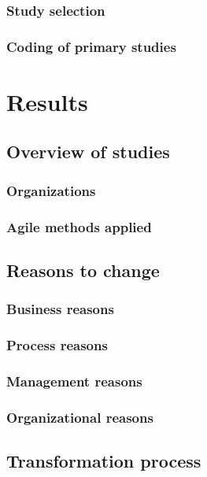 \documentclass{article}
\begin{document}
\subsubsection{Study selection}

\subsubsection{Coding of primary studies}

\section{Results}

\subsection{Overview of studies}

\setlength{\parskip}{7pt}
\subsubsection{Organizations}

\subsubsection{Agile methods applied}

\setlength{\parskip}{7pt}
\subsection{Reasons to change}

\subsubsection{Business reasons}

\subsubsection{Process reasons}

\subsubsection{Management reasons}

\subsubsection{Organizational reasons}

\subsection{Transformation process}

\end{document}
